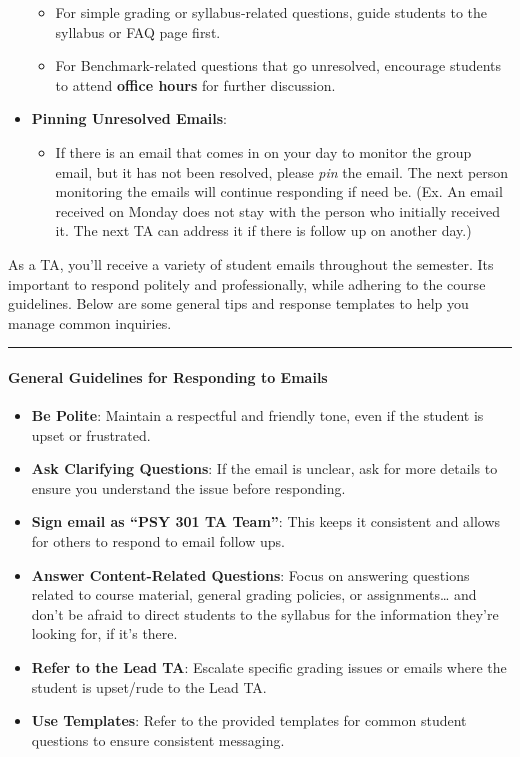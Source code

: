 \documentclass[
]{article}
\providecommand{\tightlist}{%
  \setlength{\itemsep}{0pt}\setlength{\parskip}{0pt}}
\begin{document}
\begin{itemize}
  \begin{itemize}
  \tightlist
  \item
    For simple grading or syllabus-related questions, guide students to the syllabus or FAQ page first.
  \item
    For Benchmark-related questions that go unresolved, encourage students to attend \textbf{office hours} for further discussion.
  \end{itemize}
\item
  \textbf{Pinning Unresolved Emails}:

  \begin{itemize}
  \tightlist
  \item
    If there is an email that comes in on your day to monitor the group email, but it has not been resolved, please \emph{pin} the email. The next person monitoring the emails will continue responding if need be. (Ex. An email received on Monday does not stay with the person who initially received it. The next TA can address it if there is follow up on another day.)
  \end{itemize}
\end{itemize}

As a TA, you'll receive a variety of student emails throughout the semester. Its important to respond politely and professionally, while adhering to the course guidelines. Below are some general tips and response templates to help you manage common inquiries.

\begin{center}\rule{0.5\linewidth}{0.5pt}\end{center}

\hypertarget{general-guidelines-for-responding-to-emails}{%
\paragraph{General Guidelines for Responding to Emails}\label{general-guidelines-for-responding-to-emails}}

\begin{itemize}
\tightlist
\item
  \textbf{Be Polite}: Maintain a respectful and friendly tone, even if the student is upset or frustrated.
\item
  \textbf{Ask Clarifying Questions}: If the email is unclear, ask for more details to ensure you understand the issue before responding.
\item
  \textbf{Sign email as ``PSY 301 TA Team''}: This keeps it consistent and allows for others to respond to email follow ups.
\item
  \textbf{Answer Content-Related Questions}: Focus on answering questions related to course material, general grading policies, or assignments\ldots{} and don't be afraid to direct students to the syllabus for the information they're looking for, if it's there.
\item
  \textbf{Refer to the Lead TA}: Escalate specific grading issues or emails where the student is upset/rude to the Lead TA.
\item
  \textbf{Use Templates}: Refer to the provided templates for common student questions to ensure consistent messaging.
\end{itemize}
\end{document}
